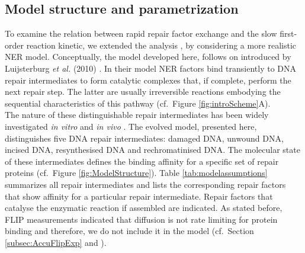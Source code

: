\subsection{Model structure and parametrization}
To examine the relation between rapid repair factor exchange and the slow first-order reaction kinetic, we extended the analysis \cite{Luijsterburg2010,Terstiege2010}, by considering a more realistic NER model. Conceptually, the model developed here, follows on introduced by Luijsterburg \textit{et al.} (2010) \cite{Luijsterburg2010}. In their model NER factors bind transiently to DNA repair intermediates to form catalytic complexes that, if complete, perform the next repair step. The latter are usually irreversible reactions embodying the sequential characteristics of this pathway (cf.\ Figure \ref{fig:introScheme}A).\\
The nature of these distinguishable repair intermediates has been widely investigated \textit{in vitro} and \textit{in vivo} \cite{Evans1997a,Mu1996,Polo2006,Tapias2004}.
The evolved model, presented here, distinguishes five DNA repair intermediates: damaged DNA, unwound DNA, incised DNA, resynthesised DNA and rechromatinised DNA. The molecular state of these intermediates defines the binding affinity for a specific set of repair proteins (cf.\ Figure \ref{fig:ModelStructure}). Table \ref{tab:modelassumptions} summarizes all repair intermediates and lists the corresponding repair factors that show affinity for a particular repair intermediate. Repair factors that catalyse the enzymatic reaction if assembled are indicated. As stated before, FLIP measurements indicated that diffusion is not rate limiting for protein binding and therefore, we do not include it in the model (cf.\ Section \ref{subsec:AccuFlipExp} and \cite{Rademakers2003,Zotter2006}).              


